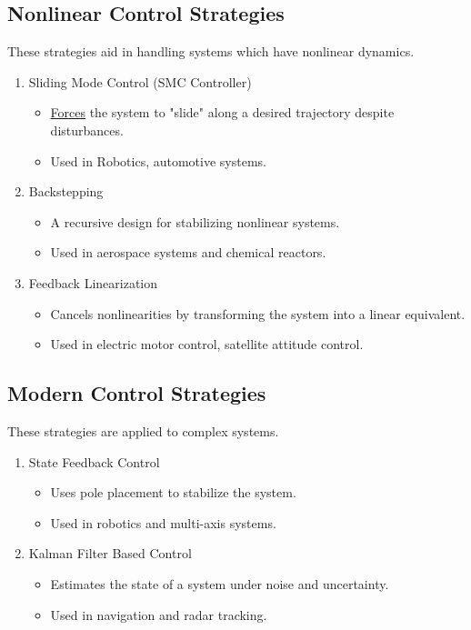 \documentclass{article}
\begin{document}
\subsection{Nonlinear Control Strategies}
These strategies aid in handling systems which have nonlinear dynamics.
\begin{enumerate}
    \item Sliding Mode Control (SMC Controller)
        \begin{itemize}
            \item \underline{Forces} the system to "slide" along a desired trajectory despite disturbances.
            \item Used in Robotics, automotive systems.
        \end{itemize}
    \item Backstepping
        \begin{itemize}
            \item A recursive design for stabilizing nonlinear systems.
            \item Used in aerospace systems and chemical reactors.
        \end{itemize}
    \item Feedback Linearization
        \begin{itemize}
            \item Cancels nonlinearities by transforming the system into a linear equivalent.
            \item Used in electric motor control, satellite attitude control.
        \end{itemize}
\end{enumerate}

\subsection{Modern Control Strategies}
These strategies are applied to complex systems.
\begin{enumerate}
    \item State Feedback Control
        \begin{itemize}
            \item Uses pole placement to stabilize the system.
            \item Used in robotics and multi-axis systems.
        \end{itemize}
    \item Kalman Filter Based Control
        \begin{itemize}
            \item Estimates the state of a system under noise and uncertainty.
            \item Used in navigation and radar tracking.
        \end{itemize}
\end{enumerate}
\end{document}
